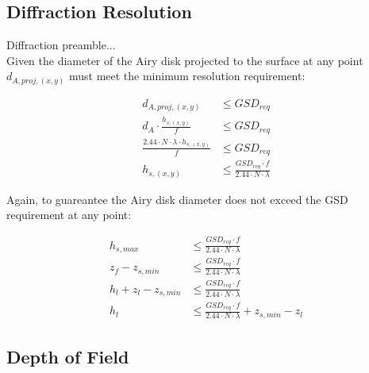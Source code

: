 \documentclass[11pt]{article}
\begin{document}
\subsection{Diffraction Resolution}

Diffraction preamble...\\

\noindent
Given the diameter of the Airy disk projected to the surface at any point $d_{A,proj,(x,y)}$ must meet the minimum resolution requirement:

\begin{align}
    d_{A,proj,(x,y)} &\leq GSD_{req}\\
    d_{A} \cdot \frac{h_{s,(x,y)}}{f} &\leq GSD_{req}\\
    \frac{2.44 \cdot N \cdot \lambda \cdot h_{s,(x,y)}}{f} &\leq GSD_{req}\\
    h_{s,(x,y)} &\leq \frac{GSD_{req} \cdot f}{2.44 \cdot N \cdot \lambda}
\end{align}

\noindent
Again, to guareantee the Airy disk diameter does not exceed the GSD requirement at any point:

\begin{align}
    h_{s,max} &\leq \frac{GSD_{req} \cdot f}{2.44 \cdot N \cdot \lambda}\\
    z_f - z_{s,min} &\leq \frac{GSD_{req} \cdot f}{2.44 \cdot N \cdot \lambda}\\
    h_l + z_l - z_{s,min} &\leq \frac{GSD_{req} \cdot f}{2.44 \cdot N \cdot \lambda}\\
    h_l &\leq \frac{GSD_{req} \cdot f}{2.44 \cdot N \cdot \lambda} + z_{s,min} - z_l
\end{align}

\subsection{Depth of Field}
\end{document}
